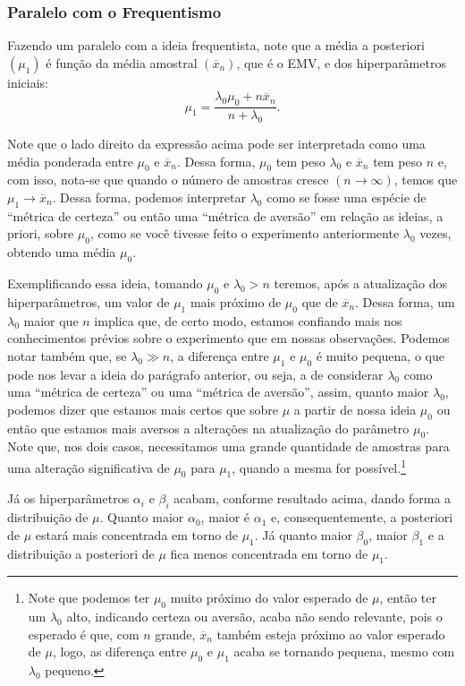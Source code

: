 \documentclass{article}
\begin{document}
\subsubsection*{Paralelo com o Frequentismo}

Fazendo um paralelo com a ideia frequentista, note que a média a posteriori $\left(\mu_1\right)$ é função da média amostral $\left(\overline{x}_n\right)$, que é o EMV, e dos hiperparâmetros iniciais:
\[\mu_1 = \dfrac{\lambda_0\mu_0 + n\overline{x}_n}{n + \lambda_0}.\]

Note que o lado direito da expressão acima pode ser interpretada como uma média ponderada entre $\mu_0$ e $\overline{x}_n$. Dessa forma, $\mu_0$ tem peso $\lambda_0$ e $\overline{x}_n$ tem peso $n$ e, com isso, nota-se que quando o número de amostras cresce $(n \to \infty)$, temos que $\mu_1 \to \overline{x}_n$. Dessa forma, podemos interpretar $\lambda_0$ como se fosse uma espécie de ``métrica de certeza'' ou então uma ``métrica de aversão'' em relação as ideias, a priori, sobre $\mu_0$, como se você tivesse feito o experimento anteriormente $\lambda_0$ vezes, obtendo uma média $\mu_0$.

Exemplificando essa ideia, tomando $\mu_0$ e $\lambda_0 > n$ teremos, após a atualização dos hiperparâmetros, um valor de $\mu_1$ mais próximo de $\mu_0$ que de $\overline{x}_n$. Dessa forma, um $\lambda_0$ maior que $n$ implica que, de certo modo, estamos confiando mais nos conhecimentos prévios sobre o experimento que em nossas observações. Podemos notar também que, se $\lambda_0 \gg n$, a diferença entre $\mu_1$ e $\mu_0$ é muito pequena, o que pode nos levar a ideia do parágrafo anterior, ou seja, a de considerar $\lambda_0$ como uma ``métrica de certeza'' ou uma ``métrica de aversão'', assim, quanto maior $\lambda_0$, podemos dizer que estamos mais certos que sobre $\mu$ a partir de nossa ideia $\mu_0$ ou então que estamos mais aversos a alterações na atualização do parâmetro $\mu_0$. Note que, nos dois casos, necessitamos uma grande quantidade de amostras para uma alteração significativa de $\mu_0$ para $\mu_1$, quando a mesma for possível.\footnote{Note que podemos ter $\mu_0$ muito próximo do valor esperado de $\mu$, então ter um $\lambda_0$ alto, indicando certeza ou aversão, acaba não sendo relevante, pois o esperado é que, com $n$ grande, $\overline{x}_n$ também esteja próximo ao valor esperado de $\mu$, logo, as diferença entre $\mu_0$ e $\mu_1$ acaba se tornando pequena, mesmo com $\lambda_0$ pequeno.}

Já os hiperparâmetros $\alpha_i$ e $\beta_i$ acabam, conforme resultado acima, dando forma a distribuição de $\mu$. Quanto maior $\alpha_0$, maior é $\alpha_1$ e, consequentemente, a posteriori de $\mu$ estará mais concentrada em torno de $\mu_1$. Já quanto maior $\beta_0$, maior $\beta_1$ e a distribuição a posteriori de $\mu$ fica menos concentrada em torno de $\mu_1$.
\end{document}
